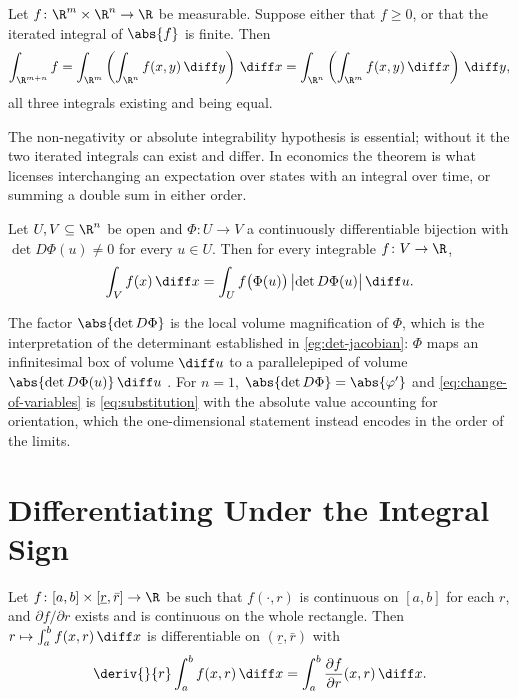 \begin{theorem}\label{thm:fubini}
	Let $f\colon\R^m\times\R^n\to\R$ be measurable. Suppose either that
	$f\geq0$, or that the iterated integral of $\abs{f}$ is finite. Then
	\[
		\int_{\R^{m+n}}f=\int_{\R^m}\left(\int_{\R^n}f(x,y)\,\diff y\right)\,\diff x
		=\int_{\R^n}\left(\int_{\R^m}f(x,y)\,\diff x\right)\,\diff y,
	\]
	all three integrals existing and being equal.
\end{theorem}

The non-negativity or absolute integrability hypothesis is essential; without
it the two iterated integrals can exist and differ. In economics the theorem is
what licenses interchanging an expectation over states with an integral over
time, or summing a double sum in either order.

\begin{theorem}\label{thm:change-of-variables}
	Let $U,V\subseteq\R^n$ be open and $\Phi\colon U\to V$ a
	continuously differentiable bijection with $\det D\Phi(u)\neq0$ for every
	$u\in U$. Then for every integrable $f\colon V\to\R$,
	\begin{equation}\label{eq:change-of-variables}
		\int_{V}f(x)\,\diff x=\int_{U}f\bigl(\Phi(u)\bigr)\,\bigl|\det D\Phi(u)\bigr|\,\diff u .
	\end{equation}
\end{theorem}

The factor $\abs{\det D\Phi}$ is the local volume magnification of $\Phi$, which
is the interpretation of the determinant established in
\autoref{eg:det-jacobian}: $\Phi$ maps an infinitesimal box of volume $\diff u$ to a
parallelepiped of volume $\abs{\det D\Phi(u)}\,\diff u$
\autocite[slide 93]{fukuda2026calculus}. For $n=1$, $\abs{\det D\Phi}=\abs{\varphi'}$
and \eqref{eq:change-of-variables} is \eqref{eq:substitution} with the absolute
value accounting for orientation, which the one-dimensional statement instead
encodes in the order of the limits.

\section{Differentiating Under the Integral Sign}\label{sec:int-leibniz}

\begin{lemma}\label{thm:differentiation-under-integral}
	Let $f\colon[a,b]\times[\underline r,\bar r]\to\R$ be such that
	$f(\cdot,r)$ is continuous on $[a,b]$ for each $r$, and
	$\partial f/\partial r$ exists and is continuous on the whole rectangle. Then
	$r\mapsto\int_a^bf(x,r)\,\diff x$ is differentiable on $(\underline r,\bar r)$ with
	\[
		\deriv{}{r}\int_a^bf(x,r)\,\diff x=\int_a^b\frac{\partial f}{\partial r}(x,r)\,\diff x .
	\]
\end{lemma}

